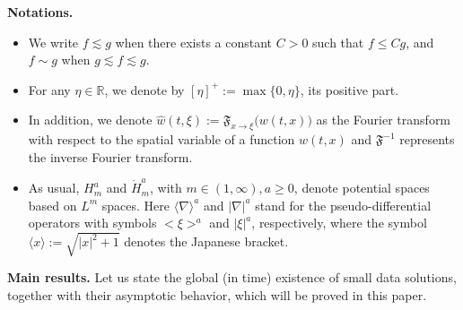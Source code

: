 \documentclass[11pt,reqno]{amsart}
\begin{document}
\textbf{Notations.} 
\begin{itemize}[leftmargin=*]
    \item We write $f\lesssim g$ when there exists a constant $C>0$ such that $f\leq Cg$, and $f \sim g$ when $g\lesssim f\lesssim g$. 

\item For any $\eta \in \mathbb{R}$, we denote by $[\eta]^+ := \max\{0, \eta\}$, its positive part.
    
    \item In addition, we denote $\widehat{w}(t,\xi):= \mathfrak{F}_{x\rightarrow \xi}\big(w(t,x)\big)$ as the Fourier transform with respect to the spatial variable of a function $w(t,x)$ and $\mathfrak{F}^{-1}$ represents the inverse Fourier transform. 
    \item As usual, $H^{a}_m$ and $\dot{H}^{a}_m$, with $m \in (1, \infty), a \geq 0$, denote potential spaces based on $L^m$ spaces. Here $\langle \nabla\rangle^{a}$ and $|\nabla|^{a}$ stand for the pseudo-differential operators with symbols $\big<\xi\big>^{a}$ and $|\xi|^{a}$, respectively, where the symbol $\langle x\rangle := \sqrt{|x|^2 +1} $ denotes the Japanese bracket.
\end{itemize}

\textbf{Main results.} Let us state the global (in time) existence of small data solutions, together with their asymptotic behavior, which will be proved in this paper.
\vspace{0.2cm}
\end{document}
